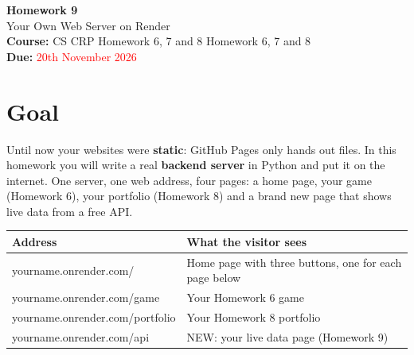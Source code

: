 \documentclass[11pt,a4paper]{article}
\begin{document}
{\Huge\bfseries\color{accent} Homework 9}\\[4pt]
{\LARGE Your Own Web Server on Render}\\[6pt]
{\large\bfseries Course:} CS CRP  Homework 6, 7 and 8  Homework 6, 7 and 8 \\
{\large\bfseries Due:} \textcolor{red}{20th November 2026}

\section{Goal}
Until now your websites were \textbf{static}: GitHub Pages only hands out files. In this homework you will write a real \textbf{backend server} in Python and put it on the internet. One server, one web address, four pages: a home page, your game (Homework 6), your portfolio (Homework 8) and a brand new page that shows live data from a free API.

\begin{center}
\begin{tabularx}{0.9\textwidth}{>{\ttfamily}l X}
\toprule
\rmfamily\bfseries Address & \bfseries What the visitor sees\\
\midrule
yourname.onrender.com/ & Home page with three buttons, one for each page below\\
yourname.onrender.com/game & Your Homework 6 game\\
yourname.onrender.com/portfolio & Your Homework 8 portfolio\\
yourname.onrender.com/api & NEW: your live data page (Homework 9)\\
\bottomrule
\end{tabularx}
\end{center}
\end{document}
